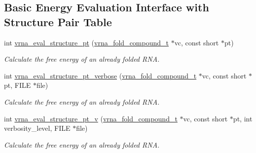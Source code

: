 \subsection*{Basic Energy Evaluation Interface with Structure Pair Table}
\begin{DoxyCompactItemize}
\item 
int \mbox{\hyperlink{group__eval_gadbd09372ddfd7a450bbd590c96a6bfe4}{vrna\+\_\+eval\+\_\+structure\+\_\+pt}} (\mbox{\hyperlink{group__fold__compound_ga1b0cef17fd40466cef5968eaeeff6166}{vrna\+\_\+fold\+\_\+compound\+\_\+t}} $\ast$vc, const short $\ast$pt)
\begin{DoxyCompactList}\small\item\em Calculate the free energy of an already folded R\+NA. \end{DoxyCompactList}\item 
int \mbox{\hyperlink{group__eval_ga8a517cfeeae8c376ae7b1e0c401d38b4}{vrna\+\_\+eval\+\_\+structure\+\_\+pt\+\_\+verbose}} (\mbox{\hyperlink{group__fold__compound_ga1b0cef17fd40466cef5968eaeeff6166}{vrna\+\_\+fold\+\_\+compound\+\_\+t}} $\ast$vc, const short $\ast$pt, F\+I\+LE $\ast$file)
\begin{DoxyCompactList}\small\item\em Calculate the free energy of an already folded R\+NA. \end{DoxyCompactList}\item 
int \mbox{\hyperlink{group__eval_ga2c6533ba0afe4c88d335d8f1e0e2a48e}{vrna\+\_\+eval\+\_\+structure\+\_\+pt\+\_\+v}} (\mbox{\hyperlink{group__fold__compound_ga1b0cef17fd40466cef5968eaeeff6166}{vrna\+\_\+fold\+\_\+compound\+\_\+t}} $\ast$vc, const short $\ast$pt, int verbosity\+\_\+level, F\+I\+LE $\ast$file)
\begin{DoxyCompactList}\small\item\em Calculate the free energy of an already folded R\+NA. \end{DoxyCompactList}\end{DoxyCompactItemize}
